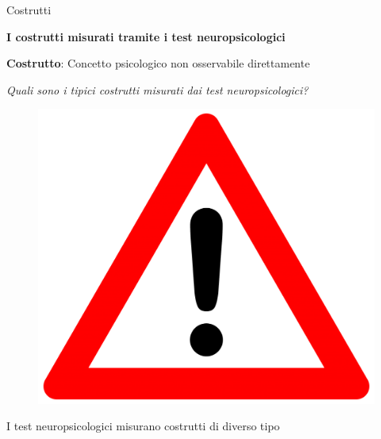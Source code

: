 \documentclass[
  ignorenonframetext,
]{beamer}
\begin{document}
\begin{frame}{Costrutti}
\label{costrutti}
\begin{center}
  \textbf{I costrutti misurati tramite i test neuropsicologici}
\end{center}

\textbf{Costrutto}: Concetto psicologico non osservabile direttamente

\emph{Quali sono i tipici costrutti misurati dai test neuropsicologici?}

\begin{figure}
  \includegraphics[scale=0.05]{Figures/triangle.png}
\end{figure}

I test neuropsicologici misurano costrutti di diverso tipo
\end{frame}
\end{document}
